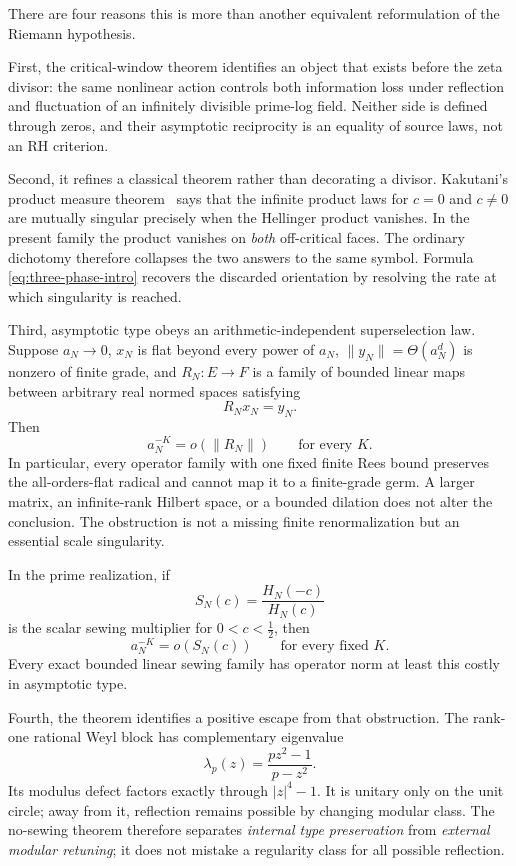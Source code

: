 \documentclass[11pt]{article}
\theoremstyle{definition}
\theoremstyle{remark}
\begin{document}
There are four reasons this is more than another equivalent reformulation of the Riemann
hypothesis.

First, the critical-window theorem identifies an object that exists before the zeta divisor:
the same nonlinear action controls both information loss under reflection and fluctuation of an
infinitely divisible prime-log field.  Neither side is defined through zeros, and their
asymptotic reciprocity is an equality of source laws, not an RH criterion.

Second, it refines a classical theorem rather than decorating a divisor.  Kakutani's product
measure theorem~\cite{Kakutani1948} says that the infinite product laws for \(c=0\) and
\(c\neq0\) are mutually singular precisely when the Hellinger product vanishes.  In the present
family the product vanishes on \emph{both} off-critical faces.  The ordinary dichotomy therefore
collapses the two answers to the same symbol.  Formula \eqref{eq:three-phase-intro} recovers the
discarded orientation by resolving the rate at which singularity is reached.

Third, asymptotic type obeys an arithmetic-independent superselection law.  Suppose
\(a_N\to0\), \(x_N\) is flat beyond every power of \(a_N\),
\(\|y_N\|=\Theta(a_N^d)\) is nonzero of finite grade, and \(R_N:E\to F\) is a
family of bounded linear maps between arbitrary real normed spaces satisfying
\[
 R_Nx_N=y_N.
 \tag{1.11}\label{eq:moderate-intro}
\]
Then
\[
 a_N^{-K}=o(\|R_N\|)\qquad\text{for every }K.
 \tag{1.12}\label{eq:operator-invariance-intro}
\]
In particular, every operator family with one fixed finite Rees bound preserves the
all-orders-flat radical and cannot map it to a finite-grade germ.  A larger matrix, an
infinite-rank Hilbert space, or a bounded dilation does not alter the conclusion.  The
obstruction is not a missing finite renormalization but an essential scale singularity.

In the prime realization, if
\[
 S_N(c)=\frac{H_N(-c)}{H_N(c)}
\]
is the scalar sewing multiplier for \(0<c<\tfrac12\), then
\[
 a_N^{-K}=o\!\left(S_N(c)\right)
 \qquad\text{for every fixed }K.
\]
Every exact bounded linear sewing family has operator norm at least this costly in asymptotic
type.

Fourth, the theorem identifies a positive escape from that obstruction.  The rank-one rational
Weyl block has complementary eigenvalue
\[
 \lambda_p(z)=\frac{pz^2-1}{p-z^2}.
 \tag{1.13}\label{eq:weyl-intro}
\]
Its modulus defect factors exactly through \(|z|^4-1\).  It is unitary only on the unit circle;
away from it, reflection remains possible by changing modular class.  The no-sewing theorem
therefore separates \emph{internal type preservation} from \emph{external modular retuning}; it
does not mistake a regularity class for all possible reflection.
\end{document}
